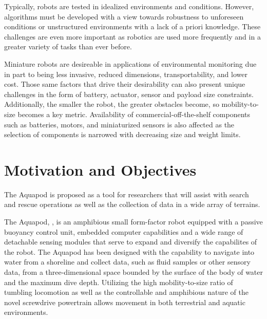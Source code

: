 Typically, robots are tested in idealized environments and conditions. However,
algorithms must be developed with a view towards robustness to
unforeseen conditions or unstructured environments with a lack of a priori
knowledge. These challenges are even more important as robotics are used more
frequently and in a greater variety of tasks than ever before.

Miniature robots are desireable in applications of environmental monitoring due
in part to being less invasive, reduced dimensions, transportability, and lower
cost. Those same factors that drive their desirability can also present unique
challenges in the form of battery, actuator, sensor and payload size constraints. 
Additionally, the smaller the robot, the greater obstacles become, so mobility-to-size
becomes a key metric. Availability of commercial-off-the-shelf components such 
as batteries, motors, and miniaturized sensors is also affected as the selection of 
components is narrowed with decreasing size and weight limits. 



\section{Motivation and Objectives}

The Aquapod is proposed as a tool for researchers that will assist with search
and rescue operations as well as the collection of data in a wide array of
terrains.

The Aquapod, \cite{Carlson2011b} \cite{Dhull2012}, is an amphibious small
form-factor robot equipped with a passive buoyancy control unit, embedded
computer capabilities and a wide range of detachable sensing modules that serve
to expand and diversify the capabilites of the robot. The Aquapod has been
designed with the capability to navigate into water from a shoreline and collect
data, such as fluid samples or other sensory data, from a three-dimensional
space bounded by the surface of the body of water and the maximum dive depth.
Utilizing the high mobility-to-size ratio of tumbling locomotion
\cite{Hemes2009} \cite{Hemes2011} as well as the controllable and amphibious
nature of the novel screwdrive powertrain allows movement in both terrestrial
and aquatic environments.


